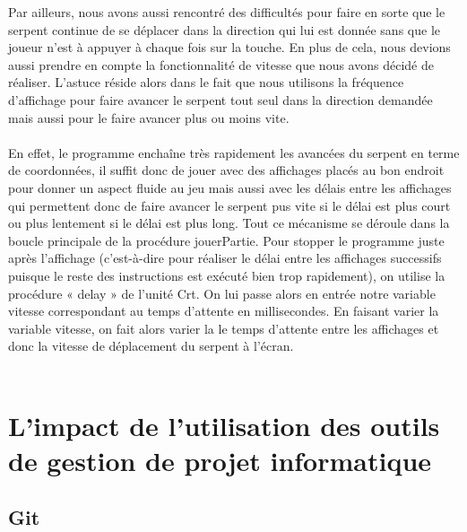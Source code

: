 \documentclass[11pt,a4paper]{article}
\begin{document}
        Par ailleurs, nous avons aussi rencontré des difficultés pour faire en sorte que le serpent continue de se déplacer dans la direction qui lui est donnée sans que le joueur n’est à appuyer à chaque fois sur la touche. En plus de cela, nous devions aussi prendre en compte la fonctionnalité de vitesse que nous avons décidé de réaliser. L’astuce réside alors dans le fait que nous utilisons la fréquence d’affichage pour faire avancer le serpent tout seul dans la direction demandée mais aussi pour le faire avancer plus ou moins vite. \\\\ En effet, le programme enchaîne très rapidement les avancées du serpent en terme de coordonnées, il suffit donc de jouer avec des affichages placés au bon endroit pour donner un aspect fluide au jeu mais aussi avec les délais entre les affichages qui permettent donc de faire avancer le serpent pus vite si le délai est plus court ou plus lentement si le délai est plus long. Tout ce mécanisme se déroule dans la boucle principale de la procédure jouerPartie. Pour stopper le programme juste après l’affichage (c’est-à-dire pour réaliser le délai entre les affichages successifs puisque le reste des instructions est exécuté bien trop rapidement), on utilise la procédure « delay » de l’unité Crt. On lui passe alors en entrée notre variable vitesse correspondant au temps d’attente en millisecondes. En faisant varier la variable vitesse, on fait alors varier la le temps d’attente entre les affichages et donc la vitesse de déplacement du serpent à l’écran. \\\\
        
        \newpage
        \hfill
        \section{L'impact de l'utilisation des outils de gestion de projet informatique}
       
        \subsection{Git}
       
        \setlength{\parindent}{1cm} %
        
\end{document}
